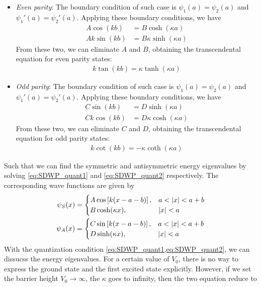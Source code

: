 \begin{itemize}
    \item \emph{Even parity}: The boundary condition of such case is $\psi_1(a)= \psi_2(a)$ and $\psi_1'(a) = \psi_2'(a)$. Applying these boundary conditions, we have
    \begin{align*}
        A \cos(kb) &= B \cosh(\kappa a) \\
        Ak \sin(kb) & = B \kappa \sinh(\kappa a)
    \end{align*}
    From these two, we can eliminate $A$ and $B$, obtaining the transcendental equation for even parity states:
    \begin{align}
        k \tan(kb) = \kappa \tanh(\kappa a) \label{eq:SDWP_quant1}
    \end{align}
    \item \emph{Odd parity}: The boundary condition of such case is $\psi_1(a)= \psi_2(a)$ and $\psi_1'(a) = \psi_2'(a)$. Applying these boundary conditions, we have
    \begin{align*}
        C \sin(kb) &= D \sinh(\kappa a) \\
        Ck \cos(kb) & = D \kappa \cosh(\kappa a)
    \end{align*}
    From these two, we can eliminate $C$ and $D$, obtaining the transcendental equation for odd parity states:
    \begin{align}
        k \cot(kb) = - \kappa \coth(\kappa a) \label{eq:SDWP_quant2}
    \end{align}
\end{itemize}
Such that we can find the symmetric and antisymmetric energy eigenvalues by solving \cref{eq:SDWP_quant1} and \cref{eq:SDWP_quant2} respectively. The corresponding wave functions are given by
\begin{align}
    \psi_S(x) &= \begin{cases}
        A \cos\left[k(x - a - b)\right], & a< \left| x \right| < a+b \\
        B \cosh(\kappa x), & \left| x \right| < a
    \end{cases} \\
    \psi_A(x) &= \begin{cases}
        C \sin\left[k(x - a - b)\right], & a< \left| x \right| < a+b \\
        D \sinh(\kappa x), & \left| x \right| < a
    \end{cases}
\end{align}
With the quantization condition \cref{eq:SDWP_quant1,eq:SDWP_quant2}, we can dissucss the energy eigenvalues. For a certain value of $V_0$, there is no way to express the ground state and the first excited state explicitly. However, if we set the barrier height $V_0 \to \infty$, the $\kappa$ goes to infinity, then the two equation reduce to 

